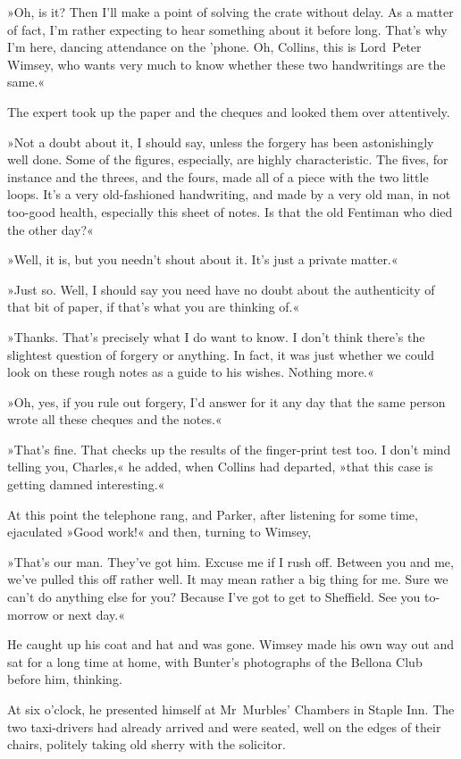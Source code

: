 »Oh, is it? Then I'll make a point of solving the crate without delay. As a matter of fact, I'm rather expecting to hear something about it before long. That's why I'm here, dancing attendance on the 'phone. Oh, Collins, this is Lord~Peter Wimsey, who wants very much to know whether these two handwritings are the same.«

The expert took up the paper and the cheques and looked them over attentively.

»Not a doubt about it, I should say, unless the forgery has been astonishingly well done. Some of the figures, especially, are highly characteristic. The fives, for instance and the threes, and the fours, made all of a piece with the two little loops. It's a very old-fashioned handwriting, and made by a very old man, in not too-good health, especially this sheet of notes. Is that the old Fentiman who died the other day?«

»Well, it is, but you needn't shout about it. It's just a private matter.«

»Just so. Well, I should say you need have no doubt about the authenticity of that bit of paper, if that's what you are thinking of.«

»Thanks. That's precisely what I do want to know. I don't think there's the slightest question of forgery or anything. In fact, it was just whether we could look on these rough notes as a guide to his wishes. Nothing more.«

»Oh, yes, if you rule out forgery, I'd answer for it any day that the same person wrote all these cheques and the notes.«

»That's fine. That checks up the results of the finger-print test too. I don't mind telling you, Charles,« he added, when Collins had departed, »that this case is getting damned interesting.«

At this point the telephone rang, and Parker, after listening for some time, ejaculated »Good work!« and then, turning to Wimsey,

»That's our man. They've got him. Excuse me if I rush off. Between you and me, we've pulled this off rather well. It may mean rather a big thing for me. Sure we can't do anything else for you? Because I've got to get to Sheffield. See you to-morrow or next day.«

He caught up his coat and hat and was gone. Wimsey made his own way out and sat for a long time at home, with Bunter's photographs of the Bellona Club before him, thinking.

At six o'clock, he presented himself at Mr~Murbles' Chambers in Staple Inn. The two taxi-drivers had already arrived and were seated, well on the edges of their chairs, politely taking old sherry with the solicitor.

